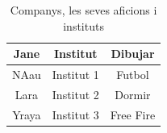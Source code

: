 \begin{table}[h]
\begin{center}
\begin{tabular}{c| c| c}
\hline
Jane & Institut & Dibujar\\
\hline
NAau &Institut 1 & Futbol\\ 
\hline
Lara &Institut 2 & Dormir\\ 
\hline
Yraya &Institut 3 & Free Fire\\ 

\end{tabular} 
\label{tab:taula1}
\caption{Companys, les seves aficions i instituts}
\end{center}
\end{table}